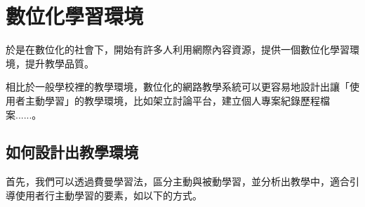 \renewcommand{\baselinestretch}{20} %
\section{數位化學習環境}
\par
\renewcommand{\baselinestretch}{1} %
\twelve 於是在數位化的社會下，開始有許多人利用網際內容資源，提供一個數位化學習環境，提升教學品質。\\
\par
\renewcommand{\baselinestretch}{1} %
\twelve 相比於一般學校裡的教學環境，數位化的網路教學系統可以更容易地設計出讓「使用者主動學習」的教學環境，比如架立討論平台，建立個人專案紀錄歷程檔案......。
\par

\renewcommand{\baselinestretch}{20} %
\subsection{如何設計出教學環境}
\par
\renewcommand{\baselinestretch}{1} %
\twelve 首先，我們可以透過費曼學習法，區分主動與被動學習，並分析出教學中，適合引導使用者行主動學習的要素，如以下的方式。
